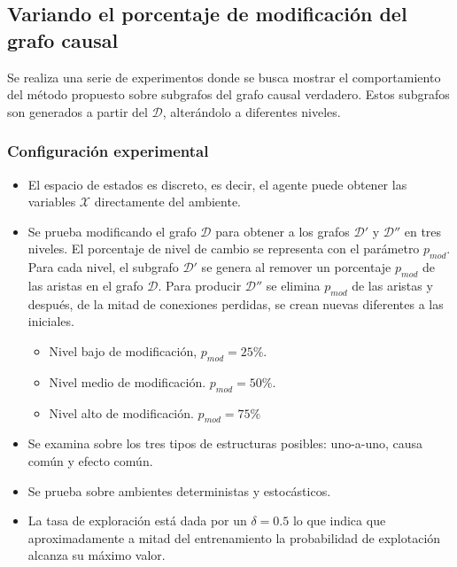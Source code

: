 \subsection{Variando el porcentaje de modificación del grafo causal}\label{exp1}

Se realiza una serie de experimentos donde se busca mostrar el comportamiento 
del método propuesto sobre subgrafos del grafo causal verdadero. Estos subgrafos son generados a partir del $\mathcal{D}$, alterándolo a diferentes niveles.

\subsubsection{Configuración experimental}

\begin{itemize}
    \item El espacio de estados es discreto, es decir, el agente puede
    obtener las variables $\mathcal{X}$ directamente del ambiente.
    \item Se prueba modificando el grafo $\mathcal{D}$ para obtener a los
    grafos $\mathcal{D'}$ y $\mathcal{D''}$ en tres niveles. El porcentaje de nivel de cambio se representa con el parámetro $p_{mod}$.
    Para cada nivel, el subgrafo $\mathcal{D'}$ se genera al remover un porcentaje $p_{mod}$ de las aristas en el grafo $\mathcal{D}$. Para producir $\mathcal{D''}$ se elimina $p_{mod}$ de las aristas y después, de la mitad de conexiones perdidas, se crean nuevas diferentes a las iniciales.
    \begin{itemize}
        \item Nivel bajo de modificación, $p_{mod} = 25 \%$.
        \item Nivel medio de modificación. $p_{mod} = 50 \%$.
        \item Nivel alto de modificación. $p_{mod} = 75 \%$
    \end{itemize}
    \item Se examina sobre los tres tipos de estructuras posibles: uno-a-uno, 
    causa común y efecto común. 
    \item Se prueba sobre ambientes deterministas y estocásticos.
    
    \item La tasa de exploración está dada por un $\delta = 0.5$ lo que indica que aproximadamente a mitad del entrenamiento la probabilidad de explotación alcanza su máximo valor.
\end{itemize}

